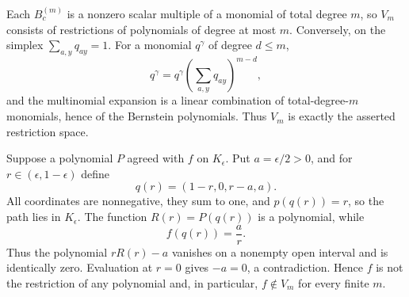 Each \(B_c^{(m)}\) is a nonzero scalar multiple of a monomial of total degree \(m\), so \(V_m\) consists of restrictions of polynomials of degree at most \(m\).  Conversely, on the simplex \(\sum_{a,y}q_{ay}=1\).  For a monomial \(q^{\gamma}\) of degree \(d\leq m\),
\[
 q^{\gamma}=q^{\gamma}\left(\sum_{a,y}q_{ay}\right)^{m-d},
\]
and the multinomial expansion is a linear combination of total-degree-\(m\) monomials, hence of the Bernstein polynomials.  Thus \(V_m\) is exactly the asserted restriction space.

Suppose a polynomial \(P\) agreed with \(f\) on \(K_{\epsilon}\).  Put \(a=\epsilon/2>0\), and for \(r\in(\epsilon,1-\epsilon)\) define
\[
 q(r)=(1-r,0,r-a,a).
\]
All coordinates are nonnegative, they sum to one, and \(p(q(r))=r\), so the path lies in \(K_{\epsilon}\).  The function \(R(r)=P(q(r))\) is a polynomial, while
\[
 f(q(r))=\frac ar.
\]
Thus the polynomial \(rR(r)-a\) vanishes on a nonempty open interval and is identically zero.  Evaluation at \(r=0\) gives \(-a=0\), a contradiction.  Hence \(f\) is not the restriction of any polynomial and, in particular, \(f\notin V_m\) for every finite \(m\).